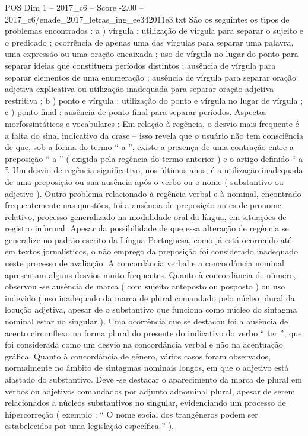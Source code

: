 \begin{textsample}{POS Dim 1 – 2017\_c6 – Score -2.00 – 2017\_c6/enade\_2017\_letras\_ing\_ee342011e3.txt}
São os seguintes os tipos de problemas encontrados : a ) vírgula : utilização de vírgula para separar o sujeito e o predicado ; ocorrência de apenas uma das vírgulas para separar uma palavra, uma expressão ou uma oração encaixada ; uso de vírgula no lugar do ponto para separar ideias que constituem períodos distintos ; ausência de vírgula para separar elementos de uma enumeração ; ausência de vírgula para separar oração adjetiva explicativa ou utilização inadequada para separar oração adjetiva restritiva ; b ) ponto e vírgula : utilização do ponto e vírgula no lugar de vírgula ; c ) ponto final : ausência de ponto final para separar períodos.
Aspectos morfossintáticos e vocabulares : Em relação à regência, o desvio mais frequente é a falta do sinal indicativo da crase – isso revela que o usuário não tem consciência de que, sob a forma do termo “ a ”, existe a presença de uma contração entre a preposição “ a ” ( exigida pela regência do termo anterior ) e o artigo definido “ a ”.
Um desvio de regência significativo, nos últimos anos, é a utilização inadequada de uma preposição ou sua ausência após o verbo ou o nome ( substantivo ou adjetivo ).
Outro problema relacionado à regência verbal e à nominal, encontrado frequentemente nas questões, foi a ausência de preposição antes de pronome relativo, processo generalizado na modalidade oral da língua, em situações de registro informal.
Apesar da possibilidade de que essa alteração de regência se generalize no padrão escrito da Língua Portuguesa, como já está ocorrendo até em textos jornalísticos, o não emprego da preposição foi considerado inadequado neste processo de avaliação.
A concordância verbal e a concordância nominal apresentam alguns desvios muito frequentes.
Quanto à concordância de número, observou -se ausência de marca ( com sujeito anteposto ou posposto ) ou uso indevido ( uso inadequado da marca de plural comandado pelo núcleo plural da locução adjetiva, apesar de o substantivo que funciona como núcleo do sintagma nominal estar no singular ).
Uma ocorrência que se destacou foi a ausência de acento circunflexo na forma plural do presente do indicativo do verbo “ ter ”, que foi considerada como um desvio na concordância verbal e não na acentuação gráfica.
Quanto à concordância de gênero, vários casos foram observados, normalmente no âmbito de sintagmas nominais longos, em que o adjetivo está afastado do substantivo.
Deve -se destacar o aparecimento da marca de plural em verbos ou adjetivos comandados por adjunto adnominal plural, apesar de serem relacionados a núcleos substantivos no singular, evidenciando um processo de hipercorreção ( exemplo : “ O nome social dos trangêneros podem ser estabelecidos por uma legislação específica ” ).

\end{textsample}
